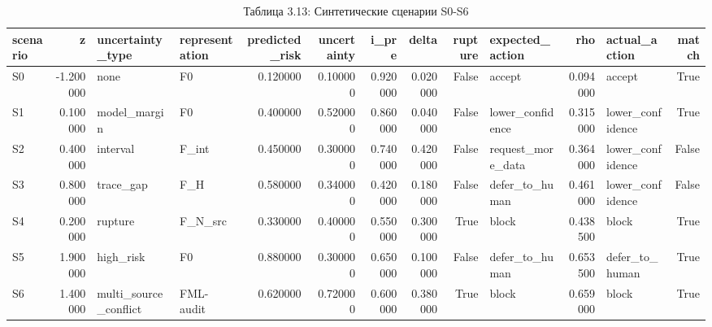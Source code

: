 \begin{table}[htbp]
\caption{Таблица 3.13: Синтетические сценарии S0-S6}
\label{tab:3_13}
\begin{tabular}{lrllrrrrrlrlr}
\toprule
scenario & z & uncertainty\_type & representation & predicted\_risk & uncertainty & i\_pre & delta & rupture & expected\_action & rho & actual\_action & match \\
\midrule
S0 & -1.200000 & none & F0 & 0.120000 & 0.100000 & 0.920000 & 0.020000 & False & accept & 0.094000 & accept & True \\
S1 & 0.100000 & model\_margin & F0 & 0.400000 & 0.520000 & 0.860000 & 0.040000 & False & lower\_confidence & 0.315000 & lower\_confidence & True \\
S2 & 0.400000 & interval & F\_int & 0.450000 & 0.300000 & 0.740000 & 0.420000 & False & request\_more\_data & 0.364000 & lower\_confidence & False \\
S3 & 0.800000 & trace\_gap & F\_H & 0.580000 & 0.340000 & 0.420000 & 0.180000 & False & defer\_to\_human & 0.461000 & lower\_confidence & False \\
S4 & 0.200000 & rupture & F\_N\_src & 0.330000 & 0.400000 & 0.550000 & 0.300000 & True & block & 0.438500 & block & True \\
S5 & 1.900000 & high\_risk & F0 & 0.880000 & 0.300000 & 0.650000 & 0.100000 & False & defer\_to\_human & 0.653500 & defer\_to\_human & True \\
S6 & 1.400000 & multi\_source\_conflict & FML-audit & 0.620000 & 0.720000 & 0.600000 & 0.380000 & True & block & 0.659000 & block & True \\
\bottomrule
\end{tabular}
\end{table}
